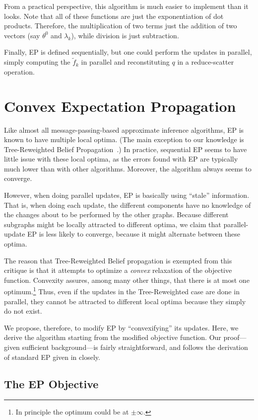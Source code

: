 \documentclass[times, 10pt,twocolumn]{article}
\begin{document}
From a practical perspective, this algorithm is much easier to
implement than it looks. Note that all of these functions are just
the exponentiation of dot products. Therefore, the multiplication
of two terms just the addition of two vectors (say $\theta^0$ and
$\lambda_k$), while division is just subtraction. 

Finally, EP is defined sequentially, but one could perform the
updates in parallel, simply computing the $\tilde f_k$ in parallel and
reconstituting $q$ in a reduce-scatter operation. 

\section{Convex Expectation Propagation}

Like almost all message-passing-based approximate inference algorithms, EP is known to
have multiple local optima. (The main exception to our knowledge
is Tree-Reweighted Belief Propagation~\cite{wainwright03trw}.) In practice, sequential EP seems to have little
issue with these local optima, as the errors found with EP are
typically much lower than with other algorithms. Moreover, the
algorithm always seems to converge.

However, when doing parallel updates, EP is basically using
``stale'' information. That is, when doing each update, the
different components have no knowledge of the changes about to be
performed by the other graphs. Because different subgraphs might
be locally attracted to different optima, we claim that
parallel-update EP is less likely to converge, because it might
alternate between these optima. 

The reason that Tree-Reweighted Belief propagation is exempted from
this critique is that it attempts to optimize a \textit{convex}
relaxation of the objective function. Convexity assures, among many
other things, that there is at most one optimum.\footnote{In principle
the optimum could be at $\pm\infty$.} Thus, even if the updates in
the Tree-Reweighted case are done in parallel, they cannot be
attracted to different local optima because they simply do not
exist.

We propose, therefore, to modify EP by ``convexifying'' its updates.
Here, we derive the algorithm starting from the modified objective
function. Our proof---given sufficient background---is fairly
straightforward, and follows the derivation of standard EP given in
\cite{wainwright08graphical} closely.

\subsection{The EP Objective}
\end{document}

